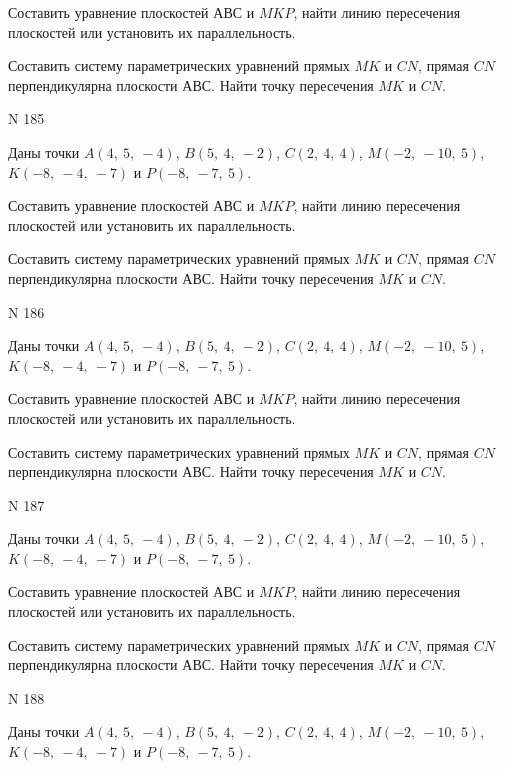 \documentclass[11pt]{report}
\begin{document}
Составить уравнение плоскостей $АВС$ и $MKP$,
найти линию пересечения плоскостей или установить их параллельность.

Составить систему параметрических уравнений прямых $MK$ и $CN$,
прямая $CN$ перпендикулярна плоскости $АВС$. 
Найти точку пересечения $MK$ и $CN$.



 N 185

Даны точки $A\left( 4, \  5, \  -4\right)$, $B\left( 5, \  4, \  -2\right)$, $C\left( 2, \  4, \  4\right)$, $M\left( -2, \  -10, \  5\right)$, $K\left( -8, \  -4, \  -7\right)$ и $P\left( -8, \  -7, \  5\right)$.


Составить уравнение плоскостей $АВС$ и $MKP$,
найти линию пересечения плоскостей или установить их параллельность.

Составить систему параметрических уравнений прямых $MK$ и $CN$,
прямая $CN$ перпендикулярна плоскости $АВС$. 
Найти точку пересечения $MK$ и $CN$.



 N 186

Даны точки $A\left( 4, \  5, \  -4\right)$, $B\left( 5, \  4, \  -2\right)$, $C\left( 2, \  4, \  4\right)$, $M\left( -2, \  -10, \  5\right)$, $K\left( -8, \  -4, \  -7\right)$ и $P\left( -8, \  -7, \  5\right)$.


Составить уравнение плоскостей $АВС$ и $MKP$,
найти линию пересечения плоскостей или установить их параллельность.

Составить систему параметрических уравнений прямых $MK$ и $CN$,
прямая $CN$ перпендикулярна плоскости $АВС$. 
Найти точку пересечения $MK$ и $CN$.



 N 187

Даны точки $A\left( 4, \  5, \  -4\right)$, $B\left( 5, \  4, \  -2\right)$, $C\left( 2, \  4, \  4\right)$, $M\left( -2, \  -10, \  5\right)$, $K\left( -8, \  -4, \  -7\right)$ и $P\left( -8, \  -7, \  5\right)$.


Составить уравнение плоскостей $АВС$ и $MKP$,
найти линию пересечения плоскостей или установить их параллельность.

Составить систему параметрических уравнений прямых $MK$ и $CN$,
прямая $CN$ перпендикулярна плоскости $АВС$. 
Найти точку пересечения $MK$ и $CN$.



 N 188

Даны точки $A\left( 4, \  5, \  -4\right)$, $B\left( 5, \  4, \  -2\right)$, $C\left( 2, \  4, \  4\right)$, $M\left( -2, \  -10, \  5\right)$, $K\left( -8, \  -4, \  -7\right)$ и $P\left( -8, \  -7, \  5\right)$.
\end{document}
